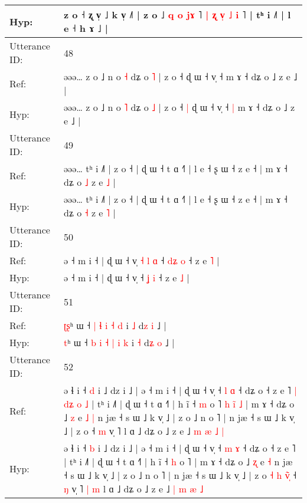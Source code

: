 \documentclass[10pt]{article}
\DeclareRobustCommand{\hl}[1]{{\textcolor{red}{#1}}}
\begin{document}
\begin{longtable}{ll}
 \\
Hyp: & z o ˧\hl{}\hl{} ʐ v̩ ˩ k v̩ ˩˥ | z o ˩ \hl{q} \hl{o}\hl{ }\hl{j}\hl{ɤ}\hl{ }˥ \hl{|} \hl{ʐ}\hl{ }\hl{v}\hl{̩} \hl{˩} \hl{i} ˥ | tʰ i ˩˥ | l e ˧ h ɤ ˩ |
 \\
\midrule
Utterance ID: & 48 \\
Ref: & əəə… z o ˩ n o \hl{˧} dʑ o \hl{˥} | z o ˧\hl{}\hl{} ɖ ɯ ˧ v̩ ˧\hl{}\hl{} m ɤ ˧ dʑ o ˩ z e ˩ |
 \\
Hyp: & əəə… z o ˩ n o \hl{˥} dʑ o \hl{˩} | z o ˧\hl{ }\hl{|} ɖ ɯ ˧ v̩ ˧\hl{ }\hl{|} m ɤ ˧ dʑ o ˩ z e ˩ |
 \\
\midrule
Utterance ID: & 49 \\
Ref: & əəə… tʰ i ˩˥ | z o ˧ | ɖ ɯ ˧ t ɑ ˧˥ | l e ˧ ʂ ɯ ˧ z e ˧ | m ɤ ˧ dʑ o \hl{˩} z e \hl{˩} |
 \\
Hyp: & əəə… tʰ i ˩˥ | z o ˧ | ɖ ɯ ˧ t ɑ ˧˥ | l e ˧ ʂ ɯ ˧ z e ˧ | m ɤ ˧ dʑ o \hl{˧} z e \hl{˥} |
 \\
\midrule
Utterance ID: & 50 \\
Ref: & ə ˧ m i ˧ | ɖ ɯ ˧ v̩\hl{ }\hl{˧}\hl{ }\hl{l}\hl{ }\hl{ɑ} ˧ \hl{d}\hl{ʑ} \hl{o} ˧ z e \hl{˥} |
 \\
Hyp: & ə ˧ m i ˧ | ɖ ɯ ˧ v̩\hl{}\hl{}\hl{}\hl{}\hl{}\hl{} ˧ \hl{}\hl{ʝ} \hl{i} ˧ z e \hl{˩} |
 \\
\midrule
Utterance ID: & 51 \\
Ref: & \hl{ʈ}\hl{ʂ}ʰ ɯ ˧\hl{}\hl{} \hl{|} \hl{ɬ} \hl{i} \hl{˧} \hl{d} i \hl{˩} d\hl{z} \hl{i} ˩ |
 \\
Hyp: & \hl{}\hl{t}ʰ ɯ ˧\hl{ }\hl{b} \hl{i} \hl{˧} \hl{|} \hl{i} \hl{k} i \hl{˧} d\hl{ʑ} \hl{o} ˩ |
 \\
\midrule
Utterance ID: & 52 \\
Ref: & ə ɬ i ˧ \hl{d} i ˩ dz i ˩ | ə ˧ m i ˧ | ɖ ɯ ˧ v̩ ˧ \hl{l} \hl{ɑ} ˧ dʑ o ˧ z e ˥\hl{ }\hl{|}\hl{ }\hl{d}\hl{ʑ}\hl{ }\hl{o}\hl{ }\hl{˩} | tʰ i ˩˥ | ɖ ɯ ˧ t ɑ ˧˥ | h ĩ ˧ \hl{m} o ˥\hl{ }\hl{h}\hl{ }\hl{i}\hl{̃}\hl{ }\hl{˩} | m ɤ ˧ dʑ o ˩ \hl{z} e\hl{ }\hl{˩} \hl{|} n jæ ˧ s ɯ ˩ k v̩ ˩ | z o ˩ n o ˥ | n jæ ˧ s ɯ ˩ k v̩ ˩ | z o\hl{}\hl{}\hl{}\hl{}\hl{}\hl{}\hl{}\hl{} ˧ \hl{m} v̩ ˥\hl{}\hl{}\hl{}\hl{} l ɑ ˩ dʑ o ˩ z e ˩ \hl{m} \hl{æ} \hl{˩} \hl{|}
 \\
Hyp: & ə ɬ i ˧ \hl{b} i ˩ dz i ˩ | ə ˧ m i ˧ | ɖ ɯ ˧ v̩ ˧ \hl{m} \hl{ɤ} ˧ dʑ o ˧ z e ˥\hl{}\hl{}\hl{}\hl{}\hl{}\hl{}\hl{}\hl{}\hl{} | tʰ i ˩˥ | ɖ ɯ ˧ t ɑ ˧˥ | h ĩ ˧ \hl{h} o ˥\hl{}\hl{}\hl{}\hl{}\hl{}\hl{}\hl{} | m ɤ ˧ dʑ o ˩ \hl{ʐ} e\hl{}\hl{} \hl{˧} n jæ ˧ s ɯ ˩ k v̩ ˩ | z o ˩ n o ˥ | n jæ ˧ s ɯ ˩ k v̩ ˩ | z o\hl{ }\hl{˧}\hl{ }\hl{h}\hl{ }\hl{v}\hl{̃}\hl{̩} ˧ \hl{ŋ} v̩ ˥\hl{ }\hl{|}\hl{ }\hl{m} l ɑ ˩ dʑ o ˩ z e ˩ \hl{|} \hl{m} \hl{æ} \hl{˩}

\end{longtable}
\end{document}
